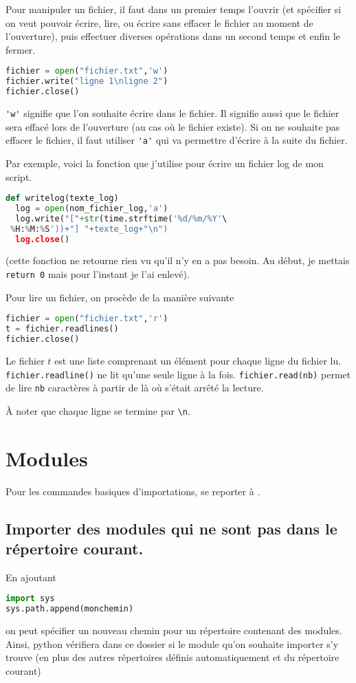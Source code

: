 \documentclass[a4paper,twoside]{article}
\begin{document}
Pour manipuler un fichier, il faut dans un premier temps l'ouvrir (et spécifier si on veut pouvoir écrire, lire, ou écrire sans effacer le fichier au moment de l'ouverture), puis effectuer diverses opérations dans un second temps et enfin le fermer.

\begin{lstlisting}[language=python]
fichier = open("fichier.txt",'w')
fichier.write("ligne 1\nligne 2")
fichier.close()
\end{lstlisting}
\verb|'w'| signifie que l'on souhaite écrire dans le fichier. Il signifie aussi que le fichier sera effacé lors de l'ouverture (au cas où le fichier existe). Si on ne souhaite pas effacer le fichier, il faut utiliser \verb|'a'| qui va permettre d'écrire à la suite du fichier.

Par exemple, voici la fonction que j'utilise pour écrire un fichier log de mon script.

\begin{lstlisting}[language=python]
def writelog(texte_log)
  log = open(nom_fichier_log,'a')
  log.write("["+str(time.strftime('%d/%m/%Y'\
 %H:%M:%S'))+"] "+texte_log+"\n")
  log.close()
\end{lstlisting}
(cette fonction ne retourne rien vu qu'il n'y en a pas besoin. Au début, je mettais \verb|return 0| mais pour l'instant je l'ai enlevé).

\bigskip

Pour lire un fichier, on procède de la manière suivante
\begin{lstlisting}[language=python]
fichier = open("fichier.txt",'r')
t = fichier.readlines()
fichier.close()
\end{lstlisting}

Le fichier $t$ est une liste comprenant un élément pour chaque ligne du fichier lu. \texttt{fichier.readline()} ne lit qu'une seule ligne à la fois. \texttt{fichier.read(nb)} permet de lire \texttt{nb} caractères à partir de là où s'était arrêté la lecture.

\begin{remarque}
À noter que chaque ligne se termine par \verb|\n|.
\end{remarque}

\section{Modules}
Pour les commandes basiques d'importations, se reporter à .

\subsection{Importer des modules qui ne sont pas dans le répertoire courant.}
En ajoutant
\begin{lstlisting}[language=python]
import sys
sys.path.append(monchemin)
\end{lstlisting}
on peut spécifier un nouveau chemin pour un répertoire contenant des modules. Ainsi, python vérifiera dans ce dossier si le module qu'on souhaite importer s'y trouve (en plus des autres répertoires définis automatiquement et du répertoire courant)
\end{document}
